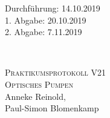 



\begin{titlepage}
  \begin{flushleft}
 Durchführung: 14.10.2019\\
 1. Abgabe: 20.10.2019\\
 2. Abgabe: 7.11.2019
  \end{flushleft}


\HRule\\[1,0cm]

 \begin{center}


\textsc{\LARGE Praktikumsprotokoll V21}\\[1.5cm]
\textsc{\huge Optisches Pumpen} \\[5,5cm]

Anneke Reinold\footnotemark[1], \\
Paul-Simon Blomenkamp\footnotemark[2] \\[1,0cm]



 \end{center}
\HRule

 \vfill
\end{titlepage}






\printbibliography


